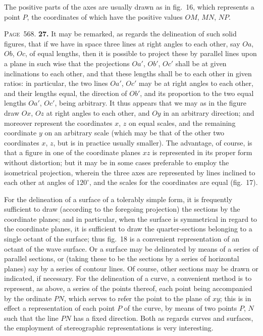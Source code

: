 \documentclass[11pt,a4paper]{article}
\theoremstyle{definition}
\begin{document}
The positive parts of the axes are usually drawn as in fig.~16, which represents a point $P$, the coordinates of which have the positive values $OM$, $MN$, $NP$.

\newpage
\noindent\textsc{Page~568.} \textbf{27.} It may be remarked, as regards the delineation of such solid figures, that if we have in space three lines at right angles to each other, say $Oa$, $Ob$, $Oc$, of equal lengths, then it is possible to project these by parallel lines upon a plane in such wise that the projections $Oa'$, $Ob'$, $Oc'$ shall be at given inclinations to each other, and that these lengths shall be to each other in given ratios: in particular, the two lines $Oa'$, $Oc'$ may be at right angles to each other, and their lengths equal, the direction of $Ob'$, and its proportion to the two equal lengths $Oa'$, $Oc'$, being arbitrary. It thus appears that we may as in the figure draw $Ox$, $Oz$ at right angles to each other, and $Oy$ in an arbitrary direction; and moreover represent the coordinates $x$, $z$ on equal scales, and the remaining coordinate $y$ on an arbitrary scale (which may be that of the other two coordinates $x$, $z$, but is in practice usually smaller). The advantage, of course, is that a figure in one of the coordinate planes $xz$ is represented in its proper form without distortion; but it may be in some cases preferable to employ the isometrical projection, wherein the three axes are represented by lines inclined to each other at angles of $120^\circ$, and the scales for the coordinates are equal (fig.~17).

For the delineation of a surface of a tolerably simple form, it is frequently sufficient to draw (according to the foregoing projection) the sections by the coordinate planes; and in particular, when the surface is symmetrical in regard to the coordinate planes, it is sufficient to draw the quarter-sections belonging to a single octant of the surface; thus fig.~18 is a convenient representation of an octant of the wave surface. Or a surface may be delineated by means of a series of parallel sections, or (taking these to be the sections by a series of horizontal planes) say by a series of contour lines. Of course, other sections may be drawn or indicated, if necessary. For the delineation of a curve, a convenient method is to represent, as above, a series of the points thereof, each point being accompanied by the ordinate $PN$, which serves to refer the point to the plane of $xy$; this is in effect a representation of each point $P$ of the curve, by means of two points $P$, $N$ such that the line $PN$ has a fixed direction. Both as regards curves and surfaces, the employment of stereographic representations is very interesting.
\end{document}
